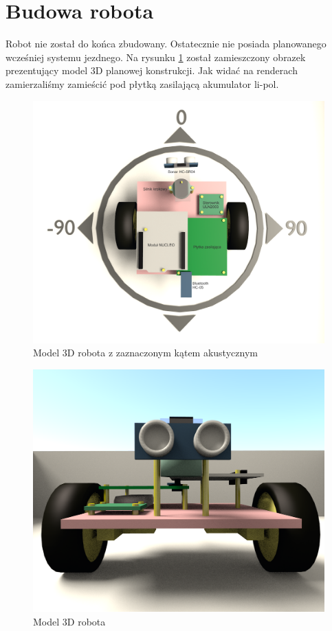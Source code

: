 \documentclass[a4paper]{article}
\begin{document}
\section{Budowa robota}
Robot nie został do końca zbudowany. Ostatecznie nie posiada planowanego wcześniej systemu jezdnego. Na rysunku \ref{m3D1} został zamieszczony obrazek prezentujący model 3D planowej konstrukcji. Jak widać na renderach zamierzaliśmy zamieścić pod płytką zasilającą akumulator li-pol.
\begin{figure}[p]
\centering
\includegraphics[height=\linewidth,angle=90]{robot4b.png}
\caption{Model 3D robota z zaznaczonym kątem akustycznym}
\label{m3D1}
\end{figure}
\begin{figure}[p]
\centering
\includegraphics[width=0.8\linewidth]{robot3.png}
\caption{Model 3D robota}
\label{m3D2}
\end{figure}
\end{document}
